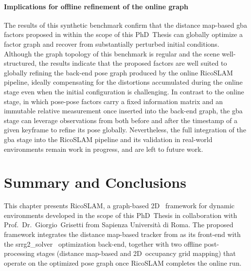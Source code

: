 \paragraph{Implications for offline refinement of the online graph}
The results of this synthetic benchmark confirm that the distance
map-based \gls{gba} factors proposed in  within the scope
of this PhD~Thesis can globally optimize a factor graph and recover from
substantially perturbed initial conditions. Although the graph topology of this
benchmark is regular and the scene well-structured, the results
indicate that the proposed factors are well suited to globally
refining the back-end pose graph produced by the online RicoSLAM
pipeline, ideally compensating for the distortions accumulated
during the online stage even when the initial configuration is
challenging. In contrast to the online stage, in which pose-pose
factors carry a fixed information matrix and an immutable relative
measurement once inserted into the back-end graph, the \gls{gba}
stage can leverage observations from both before and after the
timestamp of a given keyframe to refine its pose globally.
Nevertheless, the full integration of the \gls{gba} stage into the
RicoSLAM pipeline and its validation in real-world environments
remain work in progress, and are left to future work.

\section{Summary and Conclusions}\label{sec:slam:conclusions}

This chapter presents RicoSLAM, a graph-based
2D~ framework for
dynamic environments developed in the scope of this PhD~Thesis in
collaboration with Prof.~Dr.~Giorgio~Grisetti from Sapienza Università di Roma.
The proposed framework integrates the distance map-based tracker from
 as its front-end with
the srrg2\_solver~\cite{grisetti:robotics:2020} optimization back-end,
together with two offline post-processing stages
(distance map-based  and 2D~occupancy grid mapping)
that operate on the optimized pose graph once RicoSLAM completes the online run.

